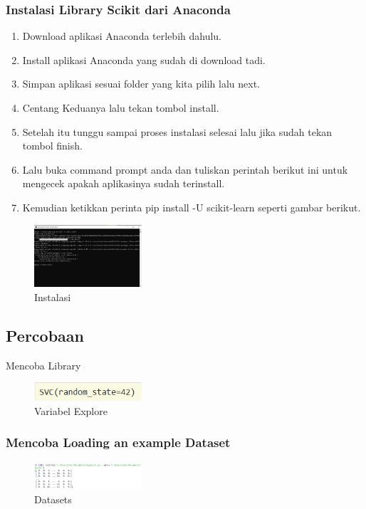 \subsubsection{Instalasi Library Scikit dari Anaconda}
\begin{enumerate}
\item Download aplikasi Anaconda terlebih dahulu. 
\item Install aplikasi Anaconda yang sudah di download tadi. 
\item Simpan aplikasi sesuai folder yang kita pilih lalu next. 
\item Centang Keduanya lalu tekan tombol install. 
\item Setelah itu tunggu sampai proses instalasi selesai lalu jika sudah tekan tombol finish. 
\item Lalu buka command prompt anda dan tuliskan perintah berikut ini untuk mengecek apakah aplikasinya sudah terinstall. 
\item Kemudian ketikkan perinta pip install -U scikit-learn seperti gambar berikut. 
\end{enumerate}
         \begin{figure}[H]
                \includegraphics[width=4cm]{figures/1174050/chapter1/instal.png}
                \centering
                \caption{Instalasi}
            \end{figure}


\subsection{Percobaan}
Mencoba Library

 \begin{figure}[H]
                \includegraphics[width=4cm]{figures/1174050/chapter1/2.png}
                \centering
                \caption{Variabel Explore}
            \end{figure}


\subsubsection{Mencoba Loading an example Dataset}

 \begin{figure}[H]
                \includegraphics[width=4cm]{figures/1174050/chapter1/1.png}
                \centering
                \caption{Datasets}
            \end{figure}


